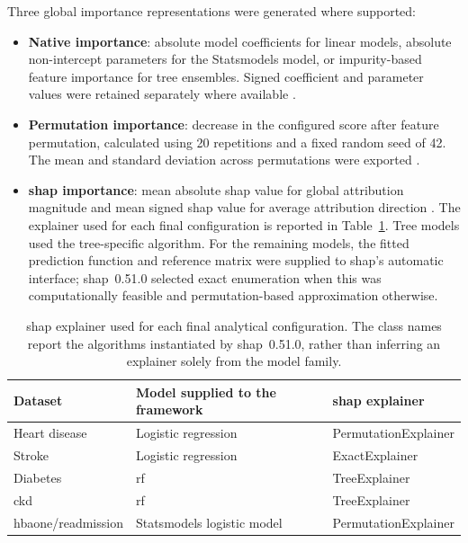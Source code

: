 Three global importance representations were generated where supported:

\begin{itemize}
    \item \textbf{Native importance}: absolute model coefficients for linear models, absolute non-intercept parameters for the Statsmodels model, or impurity-based feature importance for tree ensembles. Signed coefficient and parameter values were retained separately where available \citep{breiman_random_2001, linardatos_explainable_2020}.

    \item \textbf{Permutation importance}: decrease in the configured score after feature permutation, calculated using 20 repetitions and a fixed random seed of 42. The mean and standard deviation across permutations were exported \citep{fisher_models_2019}.

    \item \textbf{\gls{shap} importance}: mean absolute \gls{shap} value for global attribution magnitude and mean signed \gls{shap} value for average attribution direction \citep{NIPS2017_8a20a862}. The explainer used for each final configuration is reported in Table~\ref{tab:shap-explainers}. Tree models used the tree-specific algorithm. For the remaining models, the fitted prediction function and reference matrix were supplied to \gls{shap}'s automatic interface; \gls{shap}~0.51.0 selected exact enumeration when this was computationally feasible and permutation-based approximation otherwise.
\end{itemize}

\begin{table}[htbp]
    \centering
    \caption{\gls{shap} explainer used for each final analytical configuration. The class names report the algorithms instantiated by \gls{shap}~0.51.0, rather than inferring an explainer solely from the model family.}
    \label{tab:shap-explainers}
    \begin{tabular}{lll}
        \toprule
        Dataset & Model supplied to the framework & \gls{shap} explainer \\
        \midrule
        Heart disease & Logistic regression & PermutationExplainer \\
        Stroke & Logistic regression & ExactExplainer \\
        Diabetes & \Gls{rf} & TreeExplainer \\
        \gls{ckd} & \Gls{rf} & TreeExplainer \\
        \gls{hbaone}/readmission & Statsmodels logistic model & PermutationExplainer \\
        \bottomrule
    \end{tabular}
\end{table}

